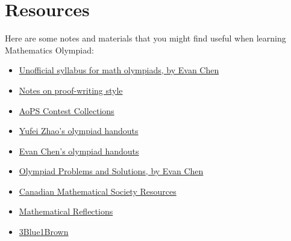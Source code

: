 \documentclass[12pt,a4 paper]{extreport}
\begin{document}
\section*{Resources}
Here are some notes and materials that you might find useful when learning Mathematics Olympiad:
\begin{itemize}
\item \href{http://www.overleaf.comhttps://web.evanchen.cc/handouts/Syllabus/Syllabus.pdf}{Unofficial syllabus for math olympiads, by Evan Chen}
\item \href{https://web.evanchen.cc/handouts/english/english.pdf}{Notes on proof-writing style}
\item \href{https://artofproblemsolving.com/community/c13_contests}{AoPS Contest Collections}
\item \href{https://yufeizhao.com/olympiad/}{Yufei Zhao's olympiad handouts}
\item \href{https://web.evanchen.cc/olympiad.html}{Evan Chen's olympiad handouts}
\item \href{https://web.evanchen.cc/problems.html}{Olympiad Problems and Solutions, by Evan Chen}
\item \href{https://cms.math.ca/competitions/problem-solving-resources/}{Canadian Mathematical Society Resources}
\item \href{https://www.awesomemath.org/}{Mathematical Reflections}
\item \href{https://www.youtube.com/@3blue1brown}{3Blue1Brown}
\end{itemize}

\tableofcontents






\end{document}
